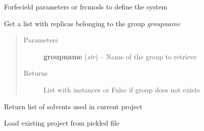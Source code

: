 \documentclass[letterpaper,10pt,english]{sphinxmanual}
\begin{document}
\begin{fulllineitems}
\begin{fulllineitems}
\end{fulllineitems}


\begin{fulllineitems}
\label{project:pyMDMix.Project.Project.extraFF}
Forfecield parameters or frcmods to define the system

\end{fulllineitems}


\begin{fulllineitems}
\label{project:pyMDMix.Project.Project.getGroup}
Get a list with replicas belonging to the group \emph{groupname}
\begin{quote}\begin{description}
\item[{Parameters}] \leavevmode
\textbf{groupname} (\emph{str}) -- Name of the group to retrieve

\item[{Returns}] \leavevmode
List with {\hyperref[replicas:pyMDMix.Replicas.Replica]{}} instances or False if group does not exists

\end{description}\end{quote}

\end{fulllineitems}


\begin{fulllineitems}
\label{project:pyMDMix.Project.Project.getSolventList}
Return list of solvents used in current project

\end{fulllineitems}


\begin{fulllineitems}
\label{project:pyMDMix.Project.Project.load}
Load existing project from pickled file

\end{fulllineitems}



\end{fulllineitems}
\end{document}
